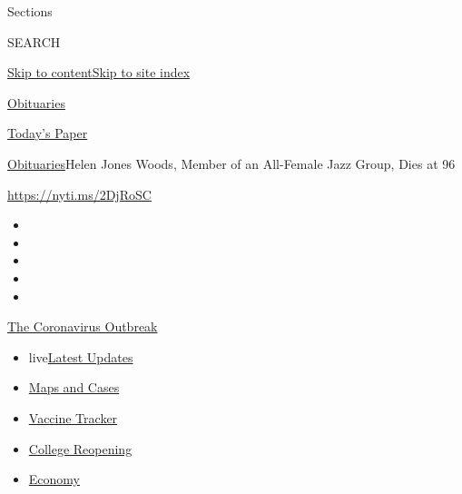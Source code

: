 Sections

SEARCH

\protect\hyperlink{site-content}{Skip to
content}\protect\hyperlink{site-index}{Skip to site index}

\href{https://www.nytimes.com/section/obituaries}{Obituaries}

\href{https://myaccount.nytimes.com/auth/login?response_type=cookie\&client_id=vi}{}

\href{https://www.nytimes.com/section/todayspaper}{Today's Paper}

\href{/section/obituaries}{Obituaries}\textbar{}Helen Jones Woods,
Member of an All-Female Jazz Group, Dies at 96

\url{https://nyti.ms/2DjRoSC}

\begin{itemize}
\item
\item
\item
\item
\item
\end{itemize}

\href{https://www.nytimes.com/news-event/coronavirus?action=click\&pgtype=Article\&state=default\&region=TOP_BANNER\&context=storylines_menu}{The
Coronavirus Outbreak}

\begin{itemize}
\tightlist
\item
  live\href{https://www.nytimes.com/2020/08/04/world/coronavirus-cases.html?action=click\&pgtype=Article\&state=default\&region=TOP_BANNER\&context=storylines_menu}{Latest
  Updates}
\item
  \href{https://www.nytimes.com/interactive/2020/us/coronavirus-us-cases.html?action=click\&pgtype=Article\&state=default\&region=TOP_BANNER\&context=storylines_menu}{Maps
  and Cases}
\item
  \href{https://www.nytimes.com/interactive/2020/science/coronavirus-vaccine-tracker.html?action=click\&pgtype=Article\&state=default\&region=TOP_BANNER\&context=storylines_menu}{Vaccine
  Tracker}
\item
  \href{https://www.nytimes.com/2020/08/02/us/covid-college-reopening.html?action=click\&pgtype=Article\&state=default\&region=TOP_BANNER\&context=storylines_menu}{College
  Reopening}
\item
  \href{https://www.nytimes.com/live/2020/08/04/business/stock-market-today-coronavirus?action=click\&pgtype=Article\&state=default\&region=TOP_BANNER\&context=storylines_menu}{Economy}
\end{itemize}

